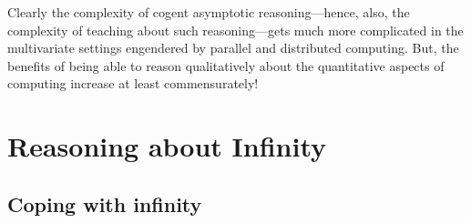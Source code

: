 \medskip

Clearly the complexity of cogent asymptotic reasoning---hence, also, the complexity of teaching about such reasoning---gets much more complicated in the multivariate settings engendered by parallel and distributed computing.  But, the benefits of being able to reason qualitatively about the quantitative aspects of computing increase at least commensurately!

\section{Reasoning about Infinity}
\label{sec:reasoning-infinity}

\subsection{Coping with infinity}
\label{sec:coping-infinity}

